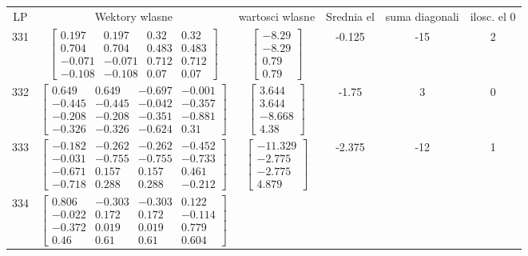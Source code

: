 \documentclass[a4paper,12pt]{article}
\begin{document}
\bgroup {} \vspace{0.2in} \begin{tabular}{c c c c c c}
LP &Wektory wlasne & wartosci wlasne & Srednia el & suma diagonali & ilosc. el 0\\
331
&
$\begin{bmatrix} 0.197 & 0.197 & 0.32 & 0.32 \\ 0.704 & 0.704 & 0.483 & 0.483 \\ -0.071 & -0.071 & 0.712 & 0.712 \\ -0.108 & -0.108 & 0.07 & 0.07 \end{bmatrix}$
&
$\begin{bmatrix} -8.29 \\ -8.29 \\ 0.79 \\ 0.79 \end{bmatrix}$
&
-0.125
&
-15
&
2
\\
332
&
$\begin{bmatrix} 0.649 & 0.649 & -0.697 & -0.001 \\ -0.445 & -0.445 & -0.042 & -0.357 \\ -0.208 & -0.208 & -0.351 & -0.881 \\ -0.326 & -0.326 & -0.624 & 0.31 \end{bmatrix}$
&
$\begin{bmatrix} 3.644 \\ 3.644 \\ -8.668 \\ 4.38 \end{bmatrix}$
&
-1.75
&
3
&
0
\\
333
&
$\begin{bmatrix} -0.182 & -0.262 & -0.262 & -0.452 \\ -0.031 & -0.755 & -0.755 & -0.733 \\ -0.671 & 0.157 & 0.157 & 0.461 \\ -0.718 & 0.288 & 0.288 & -0.212 \end{bmatrix}$
&
$\begin{bmatrix} -11.329 \\ -2.775 \\ -2.775 \\ 4.879 \end{bmatrix}$
&
-2.375
&
-12
&
1
\\
334
&
$\begin{bmatrix} 0.806 & -0.303 & -0.303 & 0.122 \\ -0.022 & 0.172 & 0.172 & -0.114 \\ -0.372 & 0.019 & 0.019 & 0.779 \\ 0.46 & 0.61 & 0.61 & 0.604 \end{bmatrix}$

\end{tabular}
\end{document}
